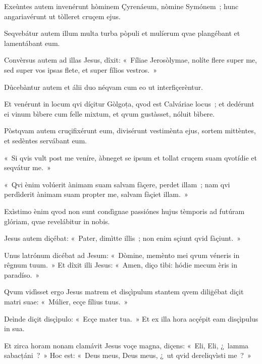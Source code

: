 Exeùntes autem invenérunt hòminem Çyrenáeum, nòmine Symónem~; hunc angariavérunt ut tòlleret cruçem ejus.

Seqvebátur autem illum multa turba pòpuli et mulíerum qvae plangébant et lamentábant eum.

Convèrsus autem ad illas Jesus, dîxit: «~Fíliae Jerosòlymae, nolíte flere super me, sed super vos ipsas flete, et super fílios vestros.~»

Důcebàntur autem et álii duo néqvam cum eo ut interfiçerèntur.

Et venérunt in locum qvi díçitur Gòlgoța, qvod est Calváriae locus~; et dedérunt ei vinum bìbere cum felle mixtum, et qvum gustàsset, nóluit bìbere.

Pòstqvam autem cruçifixérunt eum, divisérunt vestimènta ejus, sortem mittèntes, et sedèntes servábant eum.

«~Si qvis vult post me veníre, àbneget se ipsum et tollat cruçem suam qvotídie et seqvátur me.~»

«~Qvi ènim volúerit ànimam suam salvam fàçere, perdet illam~; nam qvi perdìderit ànimam suam propter me, salvam fàçiet illam.~»

Exìstimo ènim qvod non sunt condìgnae passiónes hujus tèmporis ad futúram glóriam, qvae revelábitur in nobis.


Jesus autem diçébat: «~Pater, dimìtte illis~; non enim sçiunt qvid fàçiunt.~»

Unus latrónum dicébat ad Jesum: «~Dòmine, memènto mei qvum véneris in rêgnum tuum.~» Et dîxit illi Jesus: «~Amen, diço tìbi: hódie mecum èris in paradíso.~»

Qvum vidìsset ergo Jesus matrem et disçìpulum stantem qvem diliģébat diçit matri suae: «~Múlier, ecçe fílius tuus.~»

Deìnde diçit disçìpulo: «~Ecçe mater tua.~» Et ex illa hora acçépit eam disçìpulus in sua.

Et zirca horam nonam clamávit Jesus voçe magna, diçens: «~Eli, Eli, ¿~lamma sabacțáni~?~» Hoc est: «~Deus meus, Deus meus, ¿~ut qvid dereliqvìsti me~?~»


